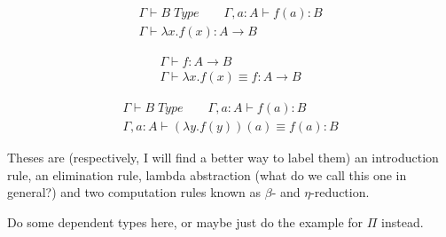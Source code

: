 \begin{equation}
  \begin{array}{c}
    \Gamma \vdash B \; Type \qquad \Gamma, a : A \vdash f(a) : B\\
    \hline
    \Gamma \vdash \lambda x . f(x) : A \rightarrow B
  \end{array}
  \label{rule:function-abstr}
\end{equation}

\begin{equation}
  \begin{array}{c}
    \Gamma \vdash f : A \rightarrow B\\
    \hline
    \Gamma \vdash \lambda x. f(x) \equiv f : A \rightarrow B
  \end{array}
  \label{rule:function-eta}
\end{equation}

\begin{equation}
  \begin{array}{c}
    \Gamma \vdash B \; Type \qquad \Gamma, a : A \vdash f(a) : B\\
    \hline
    \Gamma, a : A \vdash (\lambda y . f(y))(a) \equiv f(a) : B
  \end{array}
  \label{rule:function-beta}
\end{equation}

Theses are (respectively, I will find a better way to label them) an
introduction rule, an elimination rule, lambda abstraction (what do we call this
one in general?) and two computation rules known as $\beta$- and $\eta$-reduction.

Do some dependent types here, or maybe just do the example for $\Pi$ instead.